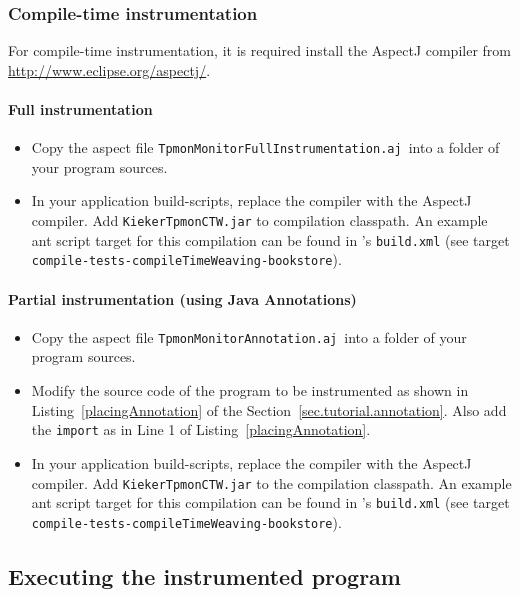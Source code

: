 \documentclass[a4paper,12pt]{scrartcl}
\begin{document}
\subsubsection{Compile-time instrumentation}

For compile-time instrumentation, it is required install the AspectJ compiler from \url{http://www.eclipse.org/aspectj/}.

\paragraph{Full instrumentation}
\begin{itemize}
 \item Copy the aspect file \small \texttt{TpmonMonitorFullInstrumentation.aj}\normalsize\ into a folder of your program sources.
\item In your application build-scripts, replace the compiler with the AspectJ compiler. Add \texttt{KiekerTpmonCTW.jar} to compilation classpath. An example ant script target for this compilation can be found in \tpmon's \texttt{build.xml} (see target \\ \texttt{compile-tests-compileTimeWeaving-bookstore}).
\end{itemize}

\paragraph{Partial instrumentation (using Java Annotations)}
\begin{itemize}
\item  Copy the aspect file \small \texttt{TpmonMonitorAnnotation.aj}\normalsize\ into a folder of your program sources.
\item Modify the source code of the program to be instrumented as shown in Listing~\ref{placingAnnotation} of the Section~\ref{sec.tutorial.annotation}. Also add the \texttt{import} as in Line 1 of Listing~\ref{placingAnnotation}.
\item In your application build-scripts, replace the compiler with the AspectJ compiler. Add \texttt{KiekerTpmonCTW.jar} to the compilation classpath. An example ant script target for this compilation can be found in \tpmon's \texttt{build.xml} (see target \\ \texttt{compile-tests-compileTimeWeaving-bookstore}).
\end{itemize}


\subsection{Executing the instrumented program}
\end{document}
